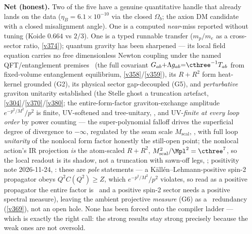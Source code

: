 \noindent\textbf{Net (honest).} Two of the five have a genuine quantitative handle that already lands on
the data ($\eta_B=6.1\times10^{-10}$ via the closed $\Omega_b$; the axion DM candidate with a closed
misalignment angle). One is a computed \emph{near}-miss reported without tuning (Koide $0.664$ vs $2/3$).
One is a typed runnable transfer ($m_p/m_e$ as a cross-sector ratio, \vref{v374}); quantum gravity has been
sharpened --- its local field equation carries no free dimensionless Newton coupling under the named QFT/entanglement premises \mC\ (the full covariant
$G_{ab}{+}\Lambda g_{ab}{=}\cthree^{-1}T_{ab}$ from fixed-volume entanglement equilibrium, \vref{v358}/\vref{v359}),
its $R+R^2$ form heat-kernel grounded (G2), its physical sector gap-decoupled
(G5), and \emph{perturbative} graviton unitarity established (the Stelle ghost a truncation artefact,
\vref{v304}/\vref{v370}/\vref{v380}; the entire-form-factor graviton-exchange amplitude $e^{-p^2/M^2}/p^2$ is
finite, UV-softened and tree-unitary, , and UV-\emph{finite at every loop order} by
power counting --- the super-polynomial falloff drives the superficial degree of divergence to $-\infty$, regulated
by the seam scale $M_{\mathrm{scal}}$, , with full loop \emph{unitarity} of the
nonlocal form factor honestly the still-open point; the nonlocal action's IR projection \emph{is} the atom-scaled
$R+R^2$, $M_{\mathrm{scal}}^2/\Mpl^2=\cthree^7$, so the local readout is its shadow, not a truncation with sawn-off legs,
; positivity note 2026-11-24, : these are
\emph{pole} statements --- a K\"all\'en--Lehmann-positive spin-2 propagator obeys $Q^2C(Q^2)\ge Z$, which
$e^{-p^2/M^2}/p^2$ violates, so read as a positive propagator the entire factor is \mX\ and a positive spin-2 sector
needs a positive spectral measure), leaving the ambient projective \emph{measure} (G6) as a \mC\ redundancy
(\vref{v369}), not an open hole. None has been
forced onto the compiler ladder --- which is exactly the right call: the strong results stay strong
precisely because the weak ones are not oversold.

